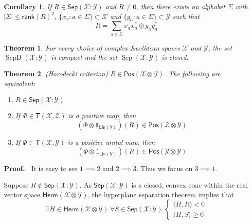\documentclass[aps,pra,onecolumn,notitlepage,superscriptaddress]{revtex4-1}
\newcommand{\spc}[1]{\mathcal{#1}}
\newcommand{\Lin}{\mathsf{Lin}}
\newcommand{\Pos}{\mathsf{Pos}}
\newcommand{\Herm}{\mathsf{Herm}}
\newcommand{\Sep}{\mathsf{Sep}}
\newcommand{\T}{\mathsf{T}}
\newcommand{\rank}{\mathsf{rank}}
\def\>{\rangle}
\def\<{\langle}
\newcommand{\op}[1]{\operatorname{#1}}
\newcommand\I{\mathds{1}}
\newtheorem{theo}{Theorem}
\newtheorem{cor}{Corollary}
\def\Proof{{\bf Proof.~}}
\begin{document}
    \begin{cor}
        If $R \in \Sep(\spc X : \spc Y)$ and $R \neq 0$, then there exists an alphabet $\Sigma$ with $|\Sigma| \leq \rank(R)^2$, $\{ x_a : a \in \Sigma \} \subset \spc X$ and $\{ y_a : a \in \Sigma \} \subset \spc Y$ such that
        \begin{equation}
            R = \sum_{a \in \Sigma} x_ax_a^* \otimes y_ay_a^*
        \end{equation}
    \end{cor}

    \begin{theo}
        For every choice of complex Euclidean spaces $\spc X$ and $\spc Y$, the set $\op{SepD}(\spc X : \spc Y)$ is compact and the set $\op{Sep}(\spc X : \spc Y)$ is closed.
    \end{theo}

    \begin{theo}
        (Horodecki criterion) $R \in \Pos(\spc X \otimes \spc Y)$. The following are equivalent:
        \begin{enumerate}
            \item $R \in \Sep(\spc X : \spc Y)$
            \item If $\Phi \in \T(\spc X, \spc Z)$ is a positive map, then
            \begin{equation}
                (\Phi \otimes \I_{\Lin(\spc Y)})(R) \in \Pos(\spc Z \otimes \spc Y)
            \end{equation}
            \item If $\Phi \in \T(\spc X, \spc Y)$ is a positive unital map, then
            \begin{equation}
                (\Phi \otimes \I_{\Lin(\spc Y)})(R) \in \Pos(\spc Y \otimes \spc Y)
            \end{equation}
        \end{enumerate}
    \end{theo}
    \Proof
    It is easy to see $1 \implies 2$ and $2 \implies 3$. Thus we focus on $3 \implies 1$. 
    
    Suppose $R \notin \Sep(\spc X : \spc Y)$. As $\Sep(\spc X : \spc Y)$ is a closed, convex cone within the real vector space $\Herm(\spc X \otimes \spc Y)$, the hyperplane separation theorem implies that
    \begin{equation}
        \exists H \in \Herm(\spc X \otimes \spc Y) \ \forall S \in \Sep(\spc X : \spc Y) \ \begin{cases}
            \<H, R\> < 0 \\
            \<H, S\> \geq 0
        \end{cases}
    \end{equation}
\end{document}
